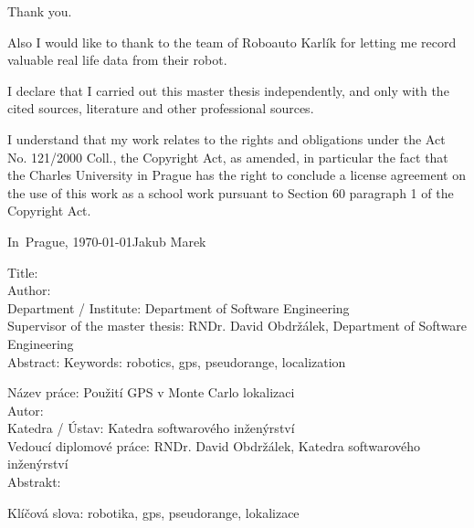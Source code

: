 

\vspace{10mm} 

Thank you.

Also I would like to thank to the team of Roboauto Karlík for letting me
record valuable real life data from their robot.

\newpage

\vspace*{\fill}
I declare that I carried out this master thesis independently, and only with the cited
sources, literature and other professional sources.

I understand that my work relates to the rights and obligations under the Act No.
121/2000 Coll., the Copyright Act, as amended, in particular the fact that the Charles
University in Prague has the right to conclude a license agreement on the use of this
work as a school work pursuant to Section 60 paragraph 1 of the Copyright Act.

\vspace{10mm} 
\noindent In~Prague, \today\hspace{\fill}Jakub Marek\\
\newpage

\tableofcontents*
\newpage

\noindent
Title: \thetitle\\
Author: \theauthor\\
Department / Institute: Department of Software Engineering\\
Supervisor of the master thesis: RNDr. David Obdržálek, Department of Software Engineering\\

\noindent Abstract: 
\noindent Keywords: robotics, gps, pseudorange, localization

\vspace{25mm}

\noindent
Název práce: Použití GPS v Monte Carlo lokalizaci\\
Autor: \theauthor\\
Katedra / Ústav: Katedra softwarového inženýrství\\
Vedoucí diplomové práce: RNDr. David Obdržálek, Katedra softwarového inženýrství\\

\noindent Abstrakt: 

\noindent Klíčová slova: robotika, gps, pseudorange, lokalizace

\newpage

